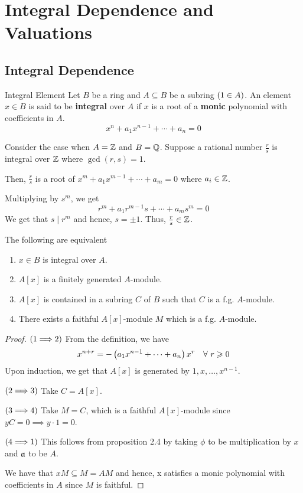\chapter{Integral Dependence and Valuations}
\label{ch:book_05_integral_dependence_and_valuations}

\section{Integral Dependence}

\begin{definition}{Integral Element}{}
	Let \(B\) be a ring and \(A \subseteq B\) be a subring \(\left( 1 \in A \right)\).
	An element \(x \in B\) is said to be \textbf{integral} over \(A\) if \(x\)
	is a root of a \textbf{monic} polynomial with coefficients in \(A\).
	\[
		x^n + a_1 x^{n-1} + \cdots + a_n = 0
	\]
\end{definition}

Consider the case when \(A = \ZZ\) and \(B = \QQ\).
Suppose a rational number \(\frac{r}{s}\) is integral over \(\ZZ\)
where \(\gcd(r, s) = 1\).

Then, \(\frac{r}{s}\) is a root of \(x^m + a_1 x^{m-1} + \cdots + a_m = 0\)
where \(a_i \in \ZZ\).

Multiplying by \(s^m\), we get
\[
	r^m + a_1 r^{m-1} s + \cdots + a_m s^m = 0
\]
We get that \(s \mid r^m\) and hence, \(s = \pm 1\).
Thus, \(\frac{r}{s} \in \ZZ\).

\begin{proposition}{}{}
\label{prop:5.1}
	The following are equivalent
	\begin{enumerate}
		\item \(x \in B\) is integral over \(A\).
		\item \(A[x]\) is a finitely generated \(A\)-module.
		\item \(A[x]\) is contained in a subring \(C\) of \(B\) such that
			\(C\) is a f.g. \(A\)-module.
		\item There exists a faithful \(A[x]\)-module \(M\) which is a
			f.g. \(A\)-module.
	\end{enumerate}
\end{proposition}
\begin{proof}
	\(\left( 1 \Longrightarrow 2 \right)\) From the definition, we have
	\[
		x^{n + r} = - \left( a_1 x^{n-1} + \cdots + a_n \right) x^r
		\quad \forall\ r \geqslant 0
	\]
	Upon induction, we get that
	\(A[x]\) is generated by \(1, x, \ldots, x^{n-1}\).

	\(\left( 2 \Longrightarrow 3 \right)\) Take \(C = A[x]\).

	\(\left( 3 \Longrightarrow 4 \right)\) Take \(M = C\), which is a faithful
	\(A[x]\)-module since \(yC = 0 \implies y \cdot 1 = 0\).

	\(\left( 4 \Longrightarrow 1 \right)\) This follows from proposition 2.4 by
	taking \(\phi\) to be multiplication by \(x\) and \(\mathfrak{a}\) to be \(A\).

	We have that \(xM \subseteq M = AM\) and hence, x satisfies a monic
	polynomial with coefficients in \(A\) since \(M\) is faithful.
\end{proof}


